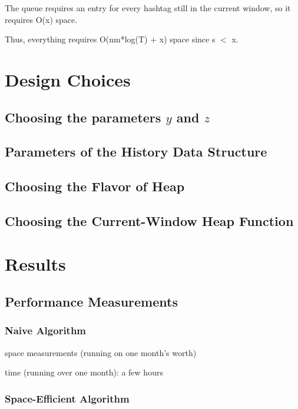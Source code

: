 \documentclass[twoside]{article}
\begin{document}
The queue requires an entry for every hashtag still in the current window, so it requires O(x) space.

Thus, everything requires O(nm*log(T) + x) space since s $<$ x.


\section{Design Choices}

\subsection{Choosing the parameters $y$ and $z$}

\subsection{Parameters of the History Data Structure}

\subsection{Choosing the Flavor of Heap}

\subsection{Choosing the Current-Window Heap Function}


\section{Results}

\subsection{Performance Measurements}

\subsubsection{Naive Algorithm}

space measurements (running on one month's worth)

time (running over one month): a few hours

\subsubsection{Space-Efficient Algorithm}
\end{document}
